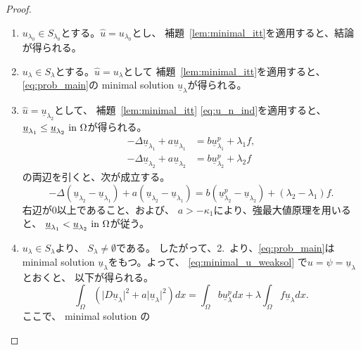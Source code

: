 \begin{proof}
 \begin{enumerate}[1.] \sage
  \item $u_{\lambda_0} \in S_{\lambda_0}$とする。$\hat{u} =
        u_{\lambda_0}$とし、
        補題~\ref{lem:minimal_itt}を適用すると、結論が得られる。
  \item $u_{\lambda} \in S_{\lambda}$とする。$\hat{u} =
        u_{\lambda}$として
        補題~\ref{lem:minimal_itt}を適用すると、
        \ref{eq:prob_main}の
        minimal solution $\underline{u}_\lambda$が得られる。
  \item $\hat{u} = \underline{u}_{\lambda_2}$として、
        補題~\ref{lem:minimal_itt}
        \eqref{eq:u_n_ind}を適用すると、
        $\underline{u}_{\lambda_1} \leq
        \underline{u}_{\lambda_2} ~\text{in}~ \Omega$が得られる。
        \begin{align*}
         -\Delta \underline{u}_{\lambda_1} + a
         \underline{u}_{\lambda_1} 
         &= b \underline{u}_{\lambda_1}^p + \lambda_1 f, \\
         -\Delta \underline{u}_{\lambda_2} + a
         \underline{u}_{\lambda_2} 
         &= b \underline{u}_{\lambda_2}^p + \lambda_2 f
        \end{align*}
        の両辺を引くと、次が成立する。
        \[
         -\Delta (\underline{u}_{\lambda_2} - \underline{u}_{\lambda_1}) + a
         (\underline{u}_{\lambda_2} - \underline{u}_{\lambda_1} )
         = b (\underline{u}_{\lambda_2}^p -
        \underline{u}_{\lambda_2}) + (\lambda_2 - \lambda_1) f.
        \]
        右辺が$0$以上であること、および、
        $a > -\kappa_1$により、強最大値原理を用いると、
        $\underline{u}_{\lambda_1} <
        \underline{u}_{\lambda_2} ~\text{in}~ \Omega$が従う。
  \item $u_\lambda \in S_\lambda$より、
        $S_\lambda \neq \emptyset$である。
        したがって、2.~より、\ref{eq:prob_main}は minimal solution
        $\underline{u}_\lambda$をもつ。よって、
        \eqref{eq:minimal_u_weaksol}
        で$u = \psi = \underline{u}_\lambda$とおくと、
        以下が得られる。
        \begin{equation}
         \int_\Omega \left( \lvert D\underline{u}_\lambda \rvert^2 + a
                      \lvert \underline{u}_\lambda \rvert^2 \right) dx 
          = \int_\Omega b\underline{u}_\lambda^p dx 
          + \lambda \int_\Omega f \underline{u}_\lambda dx.
          \label{eq:minimal_inp_same_weak}
        \end{equation}
        ここで、
        minimal solution の

\end{enumerate}
\end{proof}
